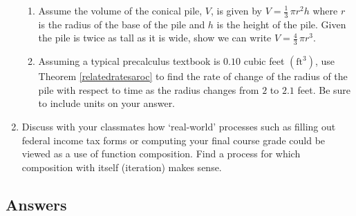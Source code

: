 \begin{enumerate}
\begin{enumerate}

\item  Assume the volume of the conical pile, $V$,  is given by $V = \frac{1}{3} \, \pi r^2 h$ where $r$ is the radius of the base of the pile and $h$ is the height of the pile.  Given the pile is twice as tall as it is wide, show we can write $V = \frac{4}{3} \, \pi r^3$.

\item  Assuming a typical precalculus textbook is $0.10$ cubic feet $\left( \text{ft}^3 \right)$, use Theorem \ref{relatedratesaroc} to find the rate of change of the radius of the pile with respect to time as the radius changes from $2$ to $2.1$ feet. Be sure to include units on your answer.

\end{enumerate}

\item Discuss with your classmates how `real-world' processes such as filling out federal income tax forms or computing your final course grade could be viewed as a use of function composition.  Find a process for which composition with itself (iteration) makes sense.

\end{enumerate}

\newpage

\subsection{Answers}


